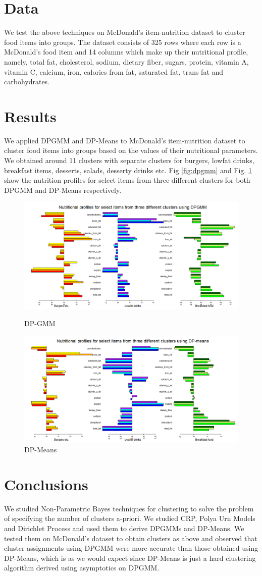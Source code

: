 \documentclass{article} %
\begin{document}
\section{Data}
We test the above techniques on McDonald's item-nutrition dataset to cluster food items into groups. The dataset consists of 325 rows where each row is a McDonald's food item and 14 columns which make up their nutritional profile, namely, total fat, cholesterol, sodium, dietary fiber, sugars, protein, vitamin A, vitamin C, calcium, iron, calories from fat, saturated fat, trans fat and carbohydrates.

\section{Results}
We applied DPGMM and DP-Means to McDonald’s item-nutrition dataset to cluster food items into groups based on the values of their nutritional parameters. We obtained around 11 clusters with separate clusters for burgers, lowfat drinks, breakfast items, desserts, salads, desserty drinks etc. Fig \ref{fig:dpgmm} and Fig. \ref{fig:dpmeans} show the nutrition profiles for select items from three different clusters for both DPGMM and DP-Means respectively.

\begin{figure}
  \centering
  \includegraphics[width=.6\linewidth]{plots/dpgmm.png}
  \caption{DP-GMM}
  \label{fig:dpgmm}
  \includegraphics[width=.6\linewidth]{plots/dpmeans.png}
  \caption{DP-Means}
  \label{fig:dpmeans}
\end{figure}


\section{Conclusions}
We studied Non-Parametric Bayes techniques for clustering to solve the problem of specifying the number of clusters a-priori. We studied CRP, Polya Urn Models and Dirichlet Process and used them to derive DPGMMs and DP-Means. We tested them on McDonald’s dataset to obtain clusters as above and observed that cluster assignments using DPGMM were more accurate than those obtained using DP-Means, which is as we would expect since DP-Means is just a hard clustering algorithm derived using asymptotics on DPGMM.
\end{document}
